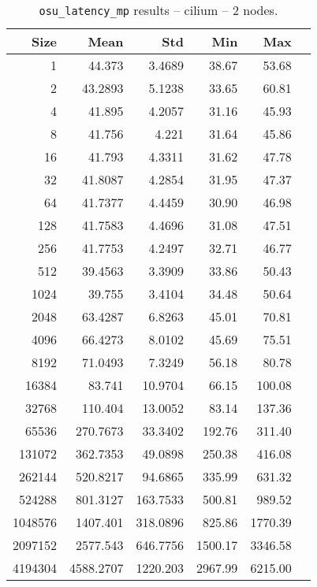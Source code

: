 \begin{table}[htbp]
\begin{minipage}{.48\textwidth}
  \label{tab:latency-mp-cilium-1nodes}
  \end{minipage}
\hfill
\begin{minipage}{.48\textwidth}
    \centering
    \footnotesize
  \begin{tabular}{rrrrrr}
	\toprule
	\textbf{Size} & \textbf{Mean} & \textbf{Std} & \textbf{Min} & \textbf{Max}	\\
	\midrule
	1	&	44.373   	&	3.4689	&	38.67	&	53.68	\\
	2	&	43.2893   	&	5.1238	&	33.65	&	60.81	\\
	4	&	41.895   	&	4.2057	&	31.16	&	45.93	\\
	8	&	41.756   	&	4.221	&	31.64	&	45.86	\\
	16	&	41.793   	&	4.3311	&	31.62	&	47.78	\\
	32	&	41.8087   	&	4.2854	&	31.95	&	47.37	\\
	64	&	41.7377   	&	4.4459	&	30.90	&	46.98	\\
	128	&	41.7583   	&	4.4696	&	31.08	&	47.51	\\
	256	&	41.7753   	&	4.2497	&	32.71	&	46.77	\\
	512	&	39.4563   	&	3.3909	&	33.86	&	50.43	\\
	1024	&	39.755   	&	3.4104	&	34.48	&	50.64	\\
	2048	&	63.4287   	&	6.8263	&	45.01	&	70.81	\\
	4096	&	66.4273   	&	8.0102	&	45.69	&	75.51	\\
	8192	&	71.0493   	&	7.3249	&	56.18	&	80.78	\\
	16384	&	83.741   	&	10.9704	&	66.15	&	100.08	\\
	32768	&	110.404   	&	13.0052	&	83.14	&	137.36	\\
	65536	&	270.7673   	&	33.3402	&	192.76	&	311.40	\\
	131072	&	362.7353   	&	49.0898	&	250.38	&	416.08	\\
	262144	&	520.8217   	&	94.6865	&	335.99	&	631.32	\\
	524288	&	801.3127   	&	163.7533	&	500.81	&	989.52	\\
	1048576	&	1407.401   	&	318.0896	&	825.86	&	1770.39	\\
	2097152	&	2577.543   	&	646.7756	&	1500.17	&	3346.58	\\
	4194304	&	4588.2707   	&	1220.203	&	2967.99	&	6215.00	\\
	\bottomrule
	\end{tabular}
  \caption{\texttt{osu\_latency\_mp} results -- cilium -- 2 nodes.}
  \label{tab:latency-mp-cilium-2nodes}
  \end{minipage}
\end{table}

